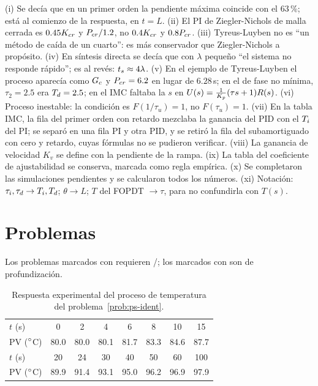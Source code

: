 \begin{profundiza}
(i) Se decía que en un primer orden la pendiente máxima coincide con el $63$\,\%; está al comienzo de la respuesta, en $t=L$. (ii) El PI de Ziegler-Nichols de malla cerrada es $0.45K_{cr}$ y $P_{cr}/1.2$, no $0.4K_{cr}$ y $0.8P_{cr}$. (iii) Tyreus-Luyben no es ``un método de caída de un cuarto'': es más conservador que Ziegler-Nichols a propósito. (iv) En síntesis directa se decía que con $\lambda$ pequeño ``el sistema no responde rápido''; es al revés: $t_s\approx4\lambda$. (v) En el ejemplo de Tyreus-Luyben el proceso aparecía como $G_c$ y $P_{cr}=6.2$ en lugar de $6.28$\,s; en el de fase no mínima, $\tau_2=2.5$ era $T_d=2.5$; en el IMC faltaba la $s$ en $U(s)=\frac{1}{K_p}(\tau s+1)R(s)$. (vi) Proceso inestable: la condición es $F(1/\tau_u)=1$, no $F(\tau_u)=1$. (vii) En la tabla IMC, la fila del primer orden con retardo mezclaba la ganancia del PID con el $T_i$ del PI; se separó en una fila PI y otra PID, y se retiró la fila del subamortiguado con cero y retardo, cuyas fórmulas no se pudieron verificar. (viii) La ganancia de velocidad $K_v$ se define con la pendiente de la rampa. (ix) La tabla del coeficiente de ajustabilidad se conserva, marcada como regla empírica. (x) Se completaron las simulaciones pendientes y se calcularon todos los números. (xi) Notación: $\tau_i,\tau_d\to T_i,T_d$; $\theta\to L$; $T$ del FOPDT $\to\tau$, para no confundirla con $T(s)$.
\end{profundiza}

\section{Problemas}
\label{sec:ps-problemas}

Los problemas marcados con \etiquetaM{} requieren \matlab/\simulink; los marcados con \etiquetaEstrella{} son de profundización.

\begin{table}[ht]
\centering
\caption{Respuesta experimental del proceso de temperatura del problema~\ref{prob:ps-ident}.}
\label{tab:ps-datos}
\small
\begin{tabular}{@{}l*{7}{c}@{}}
\toprule
$t$ (s) & 0 & 2 & 4 & 6 & 8 & 10 & 15\\
PV ($^{\circ}$C) & 80.0 & 80.0 & 80.1 & 81.7 & 83.3 & 84.6 & 87.7\\
\midrule
$t$ (s) & 20 & 24 & 30 & 40 & 50 & 60 & 100\\
PV ($^{\circ}$C) & 89.9 & 91.4 & 93.1 & 95.0 & 96.2 & 96.9 & 97.9\\
\bottomrule
\end{tabular}
\end{table}


